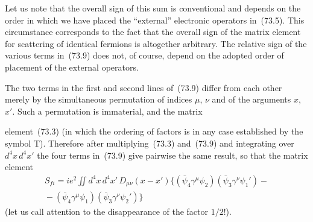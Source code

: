 Let us note that the overall sign of this sum is conventional and depends on the order in which we have placed the ``external'' electronic operators in~(73.5). This circumstance corresponds to the fact that the overall sign of the matrix element for scattering of identical fermions is altogether arbitrary. The relative sign of the various terms in~(73.9) does not, of course, depend on the adopted order of placement of the external operators.

The two terms in the first and second lines of~(73.9) differ from each other merely by the simultaneous permutation of indices $\mu$, $\nu$ and of the arguments $x$, $x'$. Such a permutation is immaterial, and the matrix

element~(73.3) (in which the ordering of factors is in any case established by the symbol T). Therefore after multiplying~(73.3) and~(73.9) and integrating over $d^4x\,d^4x'$ the four terms in~(73.9) give pairwise the same result, so that the matrix element
\begin{equation}
\begin{split}
S_{fi} = ie^2\iint d^4x\,d^4x'\,D_{\mu\nu}(x-x')\{(\bar{\psi}_4\gamma^\mu\psi_2)(\bar{\psi}_3\gamma^\nu\psi_1') -{}\\
{} - (\bar{\psi}_4\gamma^\mu\psi_1)(\bar{\psi}_3\gamma^\nu\psi_2')\}
\end{split}
\tag{73.10}
\end{equation}
(let us call attention to the disappearance of the factor $1/2!$).

